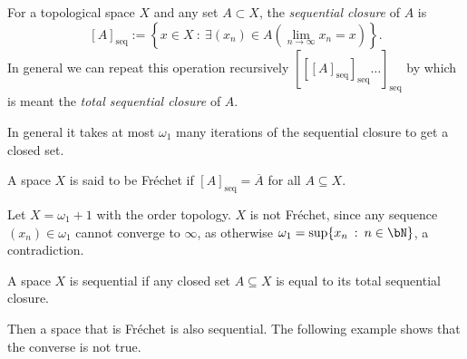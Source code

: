 \documentclass{article}
\newcommand{\seqcl}[1]{{[#1]_{\text{seq}}}}
\begin{document}
\begin{defn}
    For a topological space \(X\) and any set \(A \subset X\), the \textit{sequential closure} of \(A\) is  
    \[
        \seqcl{A} := \left\{x \in X \: : \: \exists (x_n) \in A \left(\lim_{n\to \infty} x_n = x\right) \right\}.
    \]
    In general we can repeat this operation recursively \(\seqcl{\seqcl{\seqcl{A}}\dots}\) by which is meant the \textit{total sequential closure} of \(A\).
    
\end{defn}

\begin{fact}
    In general it takes at most \(\omega_1\) many iterations of the sequential closure to get a closed set. 
\end{fact}

\begin{defn}
    A space \(X\) is said to be Fréchet if \(\seqcl{A} = \overline{A}\) for all \(A \subseteq X\).
\end{defn}
\begin{exam}
    Let \(X = \omega_1 + 1\) with the order topology. \(X\) is not Fréchet, since any sequence \((x_n) \in \omega_1\) cannot converge to \(\infty\), as otherwise \(\omega_1 = \sup\{x_n \: : \: n \in \bN\}\), a contradiction.
\end{exam}
\begin{defn}
    A space \(X\) is sequential if any closed set \(A \subseteq X\) is equal to its total sequential closure.
\end{defn}
Then a space that is Fréchet is also sequential. The following example shows that the converse is not true.
\end{document}
